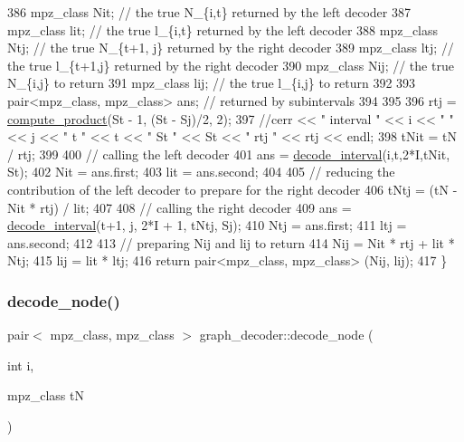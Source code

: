 \begin{DoxyCode}
386   mpz\_class Nit; \textcolor{comment}{// the true N\_\{i,t\} returned by the left decoder}
387   mpz\_class lit; \textcolor{comment}{// the true l\_\{i,t\} returned by the left decoder}
388   mpz\_class Ntj; \textcolor{comment}{// the true N\_\{t+1, j\} returned by the right decoder}
389   mpz\_class ltj; \textcolor{comment}{// the true l\_\{t+1,j\} returned by the right decoder}
390   mpz\_class Nij; \textcolor{comment}{// the true N\_\{i,j\} to return}
391   mpz\_class lij; \textcolor{comment}{// the true l\_\{i,j\} to return}
392 
393   pair<mpz\_class, mpz\_class> ans; \textcolor{comment}{// returned by subintervals }
394 
395 
396   rtj = \hyperlink{compression__helper_8cpp_ae2afb43aabe50f7d42aae8f82b5a35f4}{compute\_product}(St - 1, (St - Sj)/2, 2);
397   \textcolor{comment}{//cerr << " interval " << i << " " << j << " t " << t << " St " << St << " rtj " << rtj << endl;}
398   tNit = tN / rtj;
399 
400   \textcolor{comment}{// calling the left decoder }
401   ans = \hyperlink{classgraph__decoder_a2cb0bd279889a833d4c825e99eb72410}{decode\_interval}(i,t,2*I,tNit, St); 
402   Nit = ans.first;
403   lit = ans.second;
404 
405   \textcolor{comment}{// reducing the contribution of the left decoder to prepare for the right decoder}
406   tNtj = (tN - Nit * rtj) / lit;
407 
408   \textcolor{comment}{// calling the right decoder}
409   ans = \hyperlink{classgraph__decoder_a2cb0bd279889a833d4c825e99eb72410}{decode\_interval}(t+1, j, 2*I + 1, tNtj, Sj);
410   Ntj = ans.first;
411   ltj = ans.second;
412 
413   \textcolor{comment}{// preparing Nij and lij to return}
414   Nij = Nit * rtj + lit * Ntj;
415   lij = lit * ltj;
416   \textcolor{keywordflow}{return} pair<mpz\_class, mpz\_class> (Nij, lij);
417 \}
\end{DoxyCode}
\mbox{\label{classgraph__decoder_af3ff99a4de6035ad257ebd7c6519cdd8}} 
\subsubsection{\texorpdfstring{decode\+\_\+node()}{decode\_node()}}
{\footnotesize\ttfamily pair$<$ mpz\+\_\+class, mpz\+\_\+class $>$ graph\+\_\+decoder\+::decode\+\_\+node (\begin{DoxyParamCaption}\item[{int}]{i,  }\item[{mpz\+\_\+class}]{tN }\end{DoxyParamCaption})}



